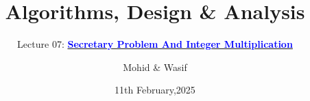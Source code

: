 \documentclass[10pt,aspectratio=43]{beamer}
\title{Algorithms, Design \& Analysis}
\subtitle{Lecture 07: \href{https://docs.google.com/document/d/1RkYqY9OvATMPILDVtHyNG_6apl93wdmuoxnDB3_DeLw/edit?usp=sharing}{\textcolor{blue}{\textbf{Secretary Problem And Integer Multiplication}}}}
\author[bscs23092 \& bscs23020]{Mohid \& Wasif}
\institute[ITU]{Information Technology University}
\date{11th February,2025}
\begin{document}
\begin{frame}
    \titlepage
\end{frame}



\end{document}
